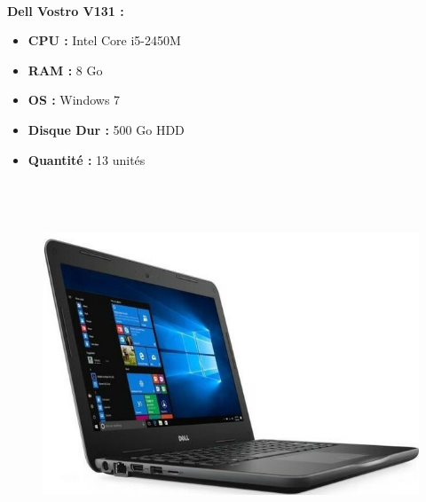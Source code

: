 \documentclass[11pt,a4paper,oneside]{article}
\begin{document}
\paragraph{}\textbf{Dell Vostro V131 :} \\
\begin{itemize}
\item \textbf{CPU :} Intel Core i5-2450M
\item \textbf{RAM :} 8 Go
\item \textbf{OS :} Windows 7
\item \textbf{Disque Dur :} 500 Go HDD
\item \textbf{Quantité :} 13 unités
\\ \\ \\ \\
\end{itemize}
\begin{figure}
\includegraphics[scale=0.4]{Ressources/Materiel/L3380.jpg}\vspace{-2cm}
\end{figure}
\end{document}
